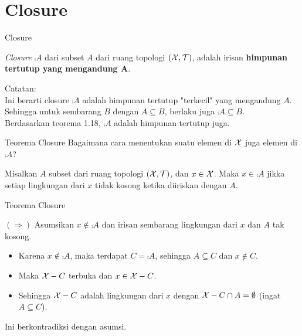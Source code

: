 \section{Closure}
\begin{frame}{Closure}
    \begin{tcolorbox}[enhanced,title=Definisi, frame style tile={width=\paperwidth}{\wallpaper}]
        \textit{Closure} $\comp{A}$ dari subset $A$ dari ruang topologi $(\mathcal{X},\mathcal{T})$, 
        adalah irisan \textbf{himpunan tertutup yang mengandung A}.
    \end{tcolorbox}
Catatan:\\
Ini berarti closure $\comp{A}$ adalah himpunan tertutup "terkecil" yang mengandung $A$. 
Sehingga untuk sembarang $B$ dengan $A\subseteq B$, berlaku juga $\comp{A} \subseteq B$.\\
Berdasarkan teorema 1.18, $\comp{A}$ adalah himpunan tertutup juga.
\end{frame}

\begin{frame}{Teorema Closure}
Bagaimana cara menentukan suatu elemen di $\mathcal{X}$ juga elemen di $\comp{A}$?  
\begin{tcolorbox}[enhanced,title=Teorema 1.19, frame style tile={width=\paperwidth}{\wallpaper}]
    Misalkan $A$ subset dari ruang topologi $(\mathcal{X},\mathcal{T})$, dan $x\in \mathcal{X}$.
    Maka $x\in\comp{A}$ jikka setiap lingkungan dari $x$ tidak kosong ketika diiriskan dengan $A$.
\end{tcolorbox}
\end{frame}

\begin{frame}{Teorema Closure} 
    \begin{tcolorbox}[enhanced,title=Teorema 1.19 (Bukti), frame style tile={width=\paperwidth}{\wallpaper}]
        $(\Rightarrow)$ Asumsikan $x\notin \comp{A}$ dan irisan sembarang lingkungan dari $x$ dan $A$ tak kosong.\\
        \begin{itemize}
            \item Karena $x\notin \comp{A}$, maka terdapat $C=\comp{A}$, sehingga $A\subseteq C$ dan $x\notin C$. 
            \item Maka $\mathcal{X}-C$ terbuka dan $x\in \mathcal{X}-C$.
            \item Sehingga $\mathcal{X}-C$ adalah lingkungan dari $x$ dengan $\mathcal{X}-C \cap A = \emptyset$ (ingat $A\subseteq C$).
        \end{itemize}
        
        Ini berkontradiksi dengan asumsi.
    \end{tcolorbox}
\end{frame}

